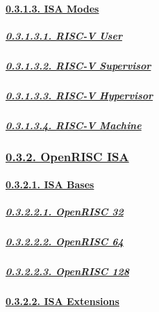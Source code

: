 \documentclass[
]{article}
\begin{document}
\hypertarget{isa-modes}{%
\paragraph{\texorpdfstring{\protect\hyperlink{isa-modes-3}{0.3.1.3. ISA
Modes}}{0.3.1.3. ISA Modes}}\label{isa-modes}}

\hypertarget{risc-v-user}{%
\subparagraph{\texorpdfstring{\protect\hyperlink{risc-v-user-1}{0.3.1.3.1.
RISC-V User}}{0.3.1.3.1. RISC-V User}}\label{risc-v-user}}

\hypertarget{risc-v-supervisor}{%
\subparagraph{\texorpdfstring{\protect\hyperlink{risc-v-supervisor-1}{0.3.1.3.2.
RISC-V
Supervisor}}{0.3.1.3.2. RISC-V Supervisor}}\label{risc-v-supervisor}}

\hypertarget{risc-v-hypervisor}{%
\subparagraph{\texorpdfstring{\protect\hyperlink{risc-v-hypervisor-1}{0.3.1.3.3.
RISC-V
Hypervisor}}{0.3.1.3.3. RISC-V Hypervisor}}\label{risc-v-hypervisor}}

\hypertarget{risc-v-machine}{%
\subparagraph{\texorpdfstring{\protect\hyperlink{risc-v-machine-1}{0.3.1.3.4.
RISC-V Machine}}{0.3.1.3.4. RISC-V Machine}}\label{risc-v-machine}}

\hypertarget{openrisc-isa}{%
\subsubsection{\texorpdfstring{\protect\hyperlink{openrisc-isa-1}{0.3.2.
OpenRISC ISA}}{0.3.2. OpenRISC ISA}}\label{openrisc-isa}}

\hypertarget{isa-bases-1}{%
\paragraph{\texorpdfstring{\protect\hyperlink{isa-bases-4}{0.3.2.1. ISA
Bases}}{0.3.2.1. ISA Bases}}\label{isa-bases-1}}

\hypertarget{openrisc-32}{%
\subparagraph{\texorpdfstring{\protect\hyperlink{openrisc-32-1}{0.3.2.2.1.
OpenRISC 32}}{0.3.2.2.1. OpenRISC 32}}\label{openrisc-32}}

\hypertarget{openrisc-64}{%
\subparagraph{\texorpdfstring{\protect\hyperlink{openrisc-64-1}{0.3.2.2.2.
OpenRISC 64}}{0.3.2.2.2. OpenRISC 64}}\label{openrisc-64}}

\hypertarget{openrisc-128}{%
\subparagraph{\texorpdfstring{\protect\hyperlink{openrisc-128-1}{0.3.2.2.3.
OpenRISC 128}}{0.3.2.2.3. OpenRISC 128}}\label{openrisc-128}}

\hypertarget{isa-extensions-1}{%
\paragraph{\texorpdfstring{\protect\hyperlink{isa-extensions-4}{0.3.2.2.
ISA Extensions}}{0.3.2.2. ISA Extensions}}\label{isa-extensions-1}}
\end{document}
